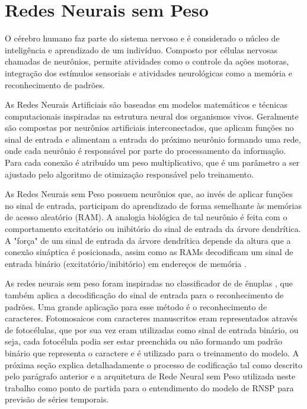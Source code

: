 \chapter{Redes Neurais sem Peso} 
\label{chap:03}

O cérebro humano faz parte do sistema nervoso e é considerado o núcleo de inteligência e aprendizado de um indivíduo. Composto por células nervosas chamadas de neurônios, permite atividades como o controle da ações motoras, integração dos estímulos sensoriais e atividades neurológicas como a memória e reconhecimento de padrões.

As Redes Neurais Artificiais são baseadas em modelos matemáticos e técnicas computacionais inspiradas na estrutura neural dos organismos vivos. Geralmente são compostas por neurônios artificiais interconectados, que aplicam funções no sinal de entrada e alimentam a entrada do próximo neurônio formando uma rede, onde cada neurônio é responsável por parte do processamento da informação. Para cada conexão é atribuído um peso multiplicativo, que é um parâmetro a ser ajustado pelo algoritmo de otimização responsável pelo treinamento.

As Redes Neurais sem Peso possuem neurônios que, ao invés de aplicar funções no sinal de entrada, participam do aprendizado de forma semelhante às memórias de acesso aleatório (RAM). A analogia biológica de tal neurônio é feita com o comportamento excitatório ou inibitório do sinal de entrada da árvore dendrítica. A "força" de um sinal de entrada da árvore dendrítica depende da altura que a conexão sináptica é posicionada, assim como as RAMs decodificam um sinal de entrada binário (excitatório/inibitório) em endereços de memória \cite{briefintrownn}.

As redes neurais sem peso foram inspiradas no classificador de de ênuplas \cite{bledsoe&browning}, que também aplica a decodificação do sinal de entrada para o reconhecimento de padrões. Uma grande aplicação para esse método é o reconhecimento de caracteres. Fotomosaicos com caracteres manuscritos eram representados através de fotocélulas, que por sua vez eram utilizadas como sinal de entrada binário, ou seja, cada fotocélula podia ser estar preenchida ou não formando um padrão binário que representa o caractere e é utilizado para o treinamento do modelo. A próxima seção explica detalhadamente o processo de codificação tal como descrito pelo parágrafo anterior e a arquitetura de Rede Neural sem Peso utilizada neste trabalho como ponto de partida para o entendimento do modelo de RNSP para previsão de séries temporais.

